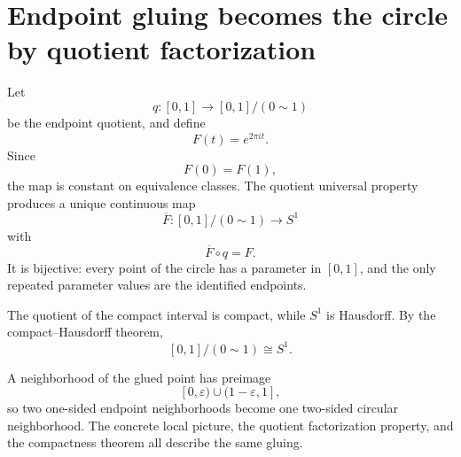\section{Endpoint gluing becomes the circle by quotient factorization}

Let
\[
  q:[0,1]\to[0,1]/(0\sim1)
\]
be the endpoint quotient, and define
\[
  F(t)=e^{2\pi it}.
\]
Since
\[
  F(0)=F(1),
\]
the map is constant on equivalence classes.  The quotient universal property produces a unique continuous map
\[
  \overline F:[0,1]/(0\sim1)\to S^1
\]
with
\[
  \overline F\circ q=F.
\]
It is bijective: every point of the circle has a parameter in \([0,1]\), and the only repeated parameter values are the identified endpoints.

The quotient of the compact interval is compact, while \(S^1\) is Hausdorff.  By the compact--Hausdorff theorem,
\[
  \boxed{
  [0,1]/(0\sim1)\cong S^1.}
\]

A neighborhood of the glued point has preimage
\[
  [0,\varepsilon)\cup(1-\varepsilon,1],
\]
so two one-sided endpoint neighborhoods become one two-sided circular neighborhood.  The concrete local picture, the quotient factorization property, and the compactness theorem all describe the same gluing.